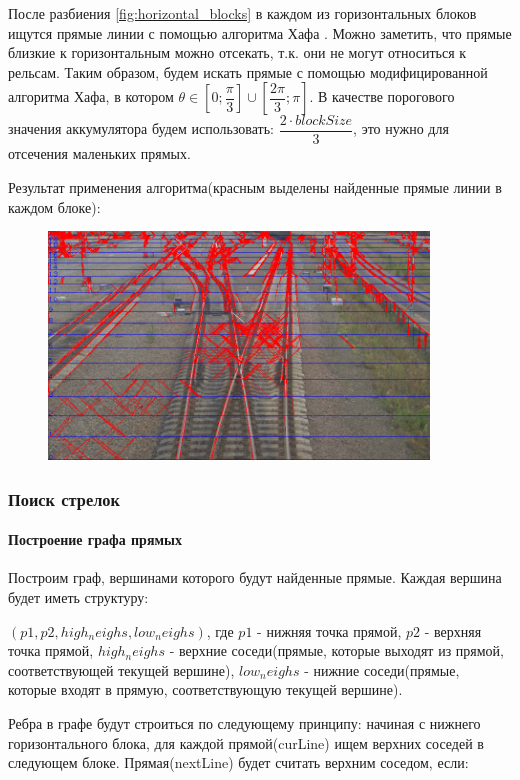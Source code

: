 После разбиения \ref{fig:horizontal_blocks} в каждом из горизонтальных блоков ищутся прямые линии с помощью алгоритма Хафа \cite{b:hough_transform}. Можно заметить, что прямые близкие к горизонтальным можно отсекать, т.к. они не могут относиться к рельсам. Таким образом, будем искать прямые с помощью модифицированной алгоритма Хафа, в котором $\theta \in [0;\dfrac{\pi}{3}] \cup [\dfrac{2\pi}{3};\pi]$. В качестве порогового значения аккумулятора будем использовать: $\dfrac{2\cdot blockSize}{3}$, это нужно для отсечения маленьких прямых.

Результат применения алгоритма(красным выделены найденные прямые линии в каждом блоке):
\begin{figure}[!h]
	\centering
	\includegraphics[width=0.9\textwidth]{pictures/hough_lines_res}
	\caption[Результат применения алгоритма]{}
	\label{fig:houghlinesres}
\end{figure}

\subsubsection{Поиск стрелок}
\paragraph{Построение графа прямых}
\label{line_graph}

Построим граф, вершинами которого будут найденные прямые. Каждая вершина будет иметь структуру: 

$(p1, p2, high_neighs, low_neighs)$, где $p1$ - нижняя точка прямой, $p2$ - верхняя точка прямой, $high_neighs$ - верхние соседи(прямые, которые выходят из прямой, соответствующей текущей вершине), $low_neighs$ - нижние соседи(прямые, которые входят в прямую, соответствующую текущей вершине). 

Ребра в графе будут строиться по следующему принципу: начиная с нижнего горизонтального блока, для каждой прямой(curLine) ищем верхних соседей в следующем блоке. Прямая(nextLine) будет считать верхним соседом, если:

